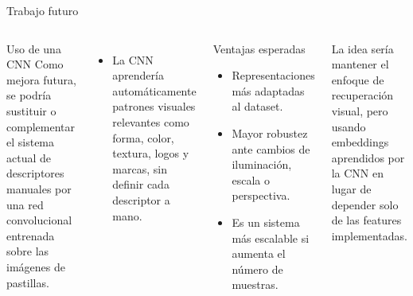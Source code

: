 \documentclass[aspectratio=169,11pt]{beamer}
\begin{document}
\begin{frame}{Trabajo futuro}
  \begin{columns}[c,onlytextwidth]


      \begin{block}{Uso de una CNN}
      Como mejora futura, se podría sustituir o complementar el sistema actual de descriptores manuales por una red convolucional entrenada sobre las imágenes de pastillas.
      \end{block}

      \vspace{0.2cm}

      \begin{itemize}
        \setlength\itemsep{0.14cm}
        \item La CNN aprendería automáticamente patrones visuales relevantes como
         forma, color, textura, logos y marcas, sin definir cada descriptor a mano.
      \end{itemize}


      \begin{block}{Ventajas esperadas}
      \begin{itemize}
        \setlength\itemsep{0.14cm}
        \item Representaciones más adaptadas al dataset.
        \item Mayor robustez ante cambios de iluminación, escala o perspectiva.
        \item Es un sistema más escalable si aumenta el número de muestras.
      \end{itemize}
      \end{block}

      \vspace{0.15cm}

      {\scriptsize
      La idea sería mantener el enfoque de recuperación visual, pero usando embeddings aprendidos por la CNN en lugar de depender solo de las features implementadas.
      }

  \end{columns}
\end{frame}
\end{document}
